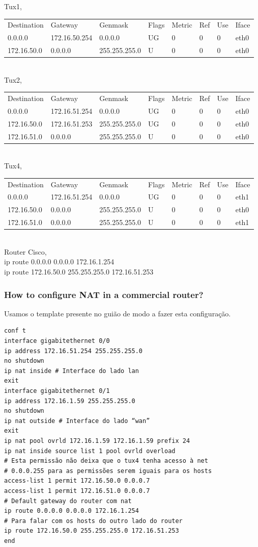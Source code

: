 \documentclass[a4paper]{article}
\begin{document}
\noindent Tux1,\\
\begin{tabular}{l l l l l l l l}
Destination & Gateway & Genmask & Flags & Metric & Ref & Use & Iface \\
0.0.0.0 & 172.16.50.254 & 0.0.0.0 & UG & 0 & 0 & 0 & eth0 \\
172.16.50.0 & 0.0.0.0 & 255.255.255.0 & U & 0 & 0 & 0 & eth0
\end{tabular}\\

\noindent Tux2,\\
\begin{tabular}{l l l l l l l l}
Destination & Gateway & Genmask & Flags & Metric & Ref & Use & Iface \\
0.0.0.0 & 172.16.51.254 & 0.0.0.0 & UG & 0 & 0 & 0 & eth0 \\
172.16.50.0 & 172.16.51.253 & 255.255.255.0 & UG & 0 & 0 & 0 & eth0 \\
172.16.51.0 & 0.0.0.0 & 255.255.255.0 & U & 0 & 0 & 0 & eth0
\end{tabular}\\

\noindent Tux4,\\
\begin{tabular}{l l l l l l l l}
Destination & Gateway & Genmask & Flags & Metric & Ref & Use & Iface \\
0.0.0.0 & 172.16.51.254 & 0.0.0.0 & UG & 0 & 0 & 0 & eth1 \\
172.16.50.0 & 0.0.0.0 & 255.255.255.0 & U & 0 & 0 & 0 & eth0 \\
172.16.51.0 & 0.0.0.0 & 255.255.255.0 & U & 0 & 0 & 0 & eth1
\end{tabular}\\

\noindent Router Cisco,\\
ip route 0.0.0.0 0.0.0.0 172.16.1.254\\
ip route 172.16.50.0 255.255.255.0 172.16.51.253

\subsubsection{How to configure NAT in a commercial router?}
Usamos o template presente no guião de modo a fazer esta configuração.

\begin{verbatim}
conf t
interface gigabitethernet 0/0
ip address 172.16.51.254 255.255.255.0
no shutdown
ip nat inside # Interface do lado lan
exit
interface gigabitethernet 0/1
ip address 172.16.1.59 255.255.255.0
no shutdown
ip nat outside # Interface do lado “wan”
exit
ip nat pool ovrld 172.16.1.59 172.16.1.59 prefix 24
ip nat inside source list 1 pool ovrld overload
# Esta permissão não deixa que o tux4 tenha acesso à net
# 0.0.0.255 para as permissões serem iguais para os hosts
access-list 1 permit 172.16.50.0 0.0.0.7
access-list 1 permit 172.16.51.0 0.0.0.7
# Default gateway do router com nat
ip route 0.0.0.0 0.0.0.0 172.16.1.254
# Para falar com os hosts do outro lado do router
ip route 172.16.50.0 255.255.255.0 172.16.51.253
end
\end{verbatim}
\end{document}
